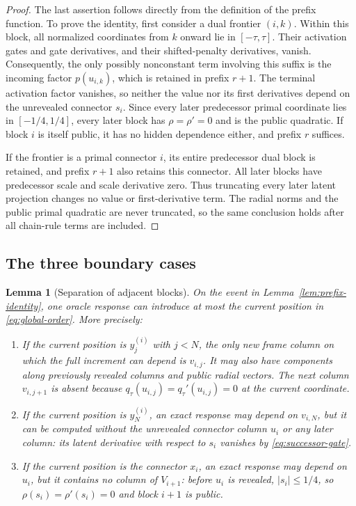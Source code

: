 \documentclass[11pt,a4paper]{article}
\newtheorem{lemma}[theorem]{Lemma}
\theoremstyle{definition}
\theoremstyle{remark}
\numberwithin{equation}{section}
\begin{document}
\begin{proof}
The last assertion follows directly from the definition of the prefix
function.  To prove the identity, first consider a dual frontier
$(i,k)$.  Within this block, all normalized coordinates from $k$ onward
lie in $[-\tau,\tau]$.  Their activation gates and gate derivatives,
and their shifted-penalty derivatives, vanish.  Consequently, the only
possibly nonconstant term involving this suffix is the incoming factor
$p(u_{i,k})$, which is retained in prefix $r+1$.  The terminal activation
factor vanishes, so neither the value nor its first derivatives depend
on the unrevealed connector $s_i$.  Since every later predecessor
primal coordinate lies in $[-1/4,1/4]$, every later block has
$\rho=\rho'=0$ and is the public quadratic.  If block $i$ is itself
public, it has no hidden dependence either, and prefix $r$ suffices.

If the frontier is a primal connector $i$, its entire predecessor dual
block is retained, and prefix $r+1$ also retains this connector.  All
later blocks have predecessor scale and scale derivative zero.  Thus
truncating every later latent projection changes no value or
first-derivative term.  The radial norms and the public primal
quadratic are never truncated, so the same conclusion holds after all
chain-rule terms are included.
\end{proof}

\subsection{The three boundary cases}

\begin{lemma}[Separation of adjacent blocks]
\label{lem:boundary-audit}
On the event in Lemma~\ref{lem:prefix-identity}, one oracle response can introduce at most the current position in \eqref{eq:global-order}.  More precisely:
\begin{enumerate}
\item If the current position is $y^{(i)}_j$ with $j<N$, the only new frame column on which the full increment can depend is
$v_{i,j}$. It may also have components along previously revealed columns
and public radial vectors. The next column $v_{i,j+1}$ is absent because
$q_\tau(u_{i,j})=q_\tau'(u_{i,j})=0$ at the current coordinate.
\item If the current position is $y^{(i)}_N$, an exact response may depend on $v_{i,N}$, but it can be computed without the unrevealed connector column
$u_i$ or any later column: its latent derivative with respect to $s_i$
vanishes by \eqref{eq:successor-gate}.
\item If the current position is the connector $x_i$, an exact response may depend on $u_i$, but it contains no column of $V_{i+1}$: before $u_i$ is revealed, $|s_i|\le1/4$, so $\rho(s_i)=\rho'(s_i)=0$ and block $i+1$ is public.
\end{enumerate}
\end{lemma}
\end{document}
